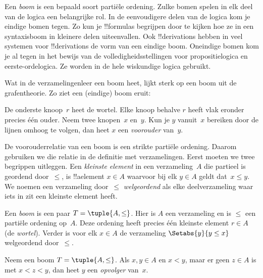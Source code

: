 \documentclass[../../../include/open-logic-section]{subfiles}
\begin{document}

Een \emph{boom} is een bepaald soort partiële ordening. Zulke bomen
spelen in elk deel van de logica een belangrijke rol. In de
eenvoudigere delen van de logica kom je eindige bomen tegen. Zo kun je
!!{formula}s begrijpen door te kijken hoe ze in een syntaxisboom in
kleinere delen uiteenvallen. Ook !!{derivation}s hebben in veel
systemen voor !!{derivation}s de vorm van een eindige boom.
%
Oneindige bomen kom je al tegen in het bewijs van de
volledigheidsstellingen voor propositielogica en eerste-ordelogica. Ze
worden in de hele wiskundige logica gebruikt.

Wat in de verzamelingenleer een boom heet, lijkt sterk op een boom uit
de grafentheorie. Zo ziet een (eindige) boom eruit:

\begin{center}
\end{center}

De onderste knoop~$r$ heet de wortel. Elke knoop behalve $r$ heeft
vlak eronder precies één ouder. Neem twee knopen~$x$ en~$y$. Kun je
$y$ vanuit~$x$ bereiken door de lijnen omhoog te volgen, dan heet $x$
een \emph{voorouder} van~$y$.

De voorouderrelatie van een boom is een strikte partiële ordening.
Daarom gebruiken we die relatie in de definitie met verzamelingen.
Eerst moeten we twee begrippen uitleggen. Een \emph{kleinste element}
in een verzameling~$A$ die partieel is geordend door~$\le$, is
!!a{element} $x \in A$ waarvoor bij elk $y \in A$ geldt dat~$x \le y$.
We noemen een verzameling door~$\le$ \emph{welgeordend} als elke
deelverzameling waar iets in zit een kleinste element heeft.

\begin{defn}[Boom]
Een \emph{boom} is een paar $T = \tuple{A, \le}$. Hier is $A$ een
verzameling en is $\le$ een partiële ordening op~$A$. Deze ordening
heeft precies één kleinste element $r \in A$ (de \emph{wortel}).
Verder is voor elk $x \in A$ de verzameling
$\Setabs{y}{y \le x}$ welgeordend door~$\le$.
\end{defn}

\begin{defn}[Opvolgers]
Neem een boom $T = \tuple{A, \le}$.
Als $x,y \in A$ en $x < y$, maar er geen $z \in A$ is met
$x < z < y$, dan heet $y$ een \emph{opvolger} van~$x$.
\end{defn}
\end{document}
